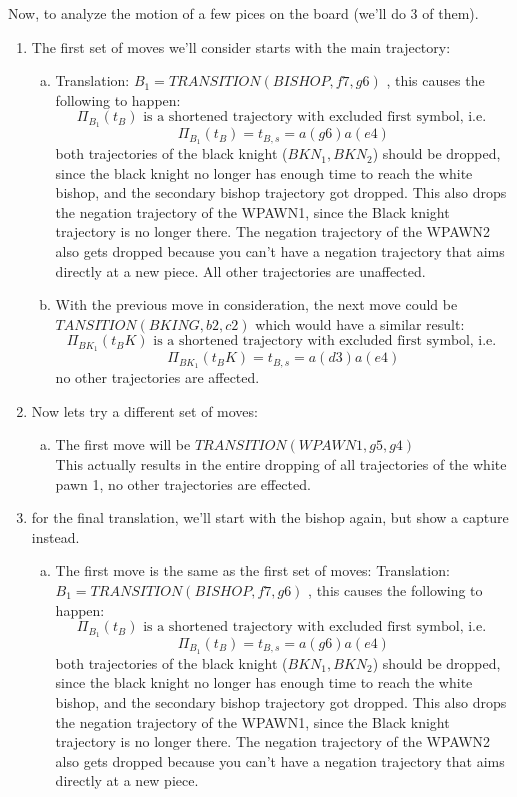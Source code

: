 \documentclass[11pt]{article}
\begin{document}
Now, to analyze the motion of a few pices on the board (we'll do 3 of them).
\begin{enumerate}
\item The first set of moves we'll consider starts with the main trajectory:
\begin{enumerate}[(a)]
\item Translation: $B_1 = TRANSITION(BISHOP, f7, g6)$ , this causes the following to happen: 
$$\Pi_{B_1}(t_B) \text{ is a shortened trajectory with excluded first symbol, i.e. }$$
$$\Pi_{B_1}(t_B) = t_{B,s} = a(g6)a(e4)$$
both trajectories of the black knight ($BKN_1, BKN_2$) should be dropped, since the black knight no longer has enough time to reach the white bishop, and the secondary bishop trajectory got dropped. This also drops the negation trajectory of the WPAWN1, since the Black knight trajectory is no longer there. The negation trajectory of the WPAWN2 also gets dropped because you can't have a negation trajectory that aims directly at a new piece. 
All other trajectories are unaffected. \\
\item With the previous move in consideration, the next move could be $TANSITION(BKING, b2, c2)$ which would have a similar result: 
$$\Pi_{BK_1}(t_BK) \text{ is a shortened trajectory with excluded first symbol, i.e. }$$
$$\Pi_{BK_1}(t_BK) = t_{B,s} = a(d3)a(e4)$$
no other trajectories are affected. \\
\end{enumerate}
\item Now lets try a different set of moves:
\begin{enumerate}[(a)]
\item The first move will be $ TRANSITION(WPAWN1, g5, g4)$\\
This actually results in the entire dropping of all trajectories of the white pawn 1, no other trajectories are effected.
\end{enumerate}
\item for the final translation, we'll start with the bishop again, but show a capture instead. 
\begin{enumerate}[(a)]
\item  The first move is the same as the first set of moves: Translation: $B_1 = TRANSITION(BISHOP, f7, g6)$ , this causes the following to happen: 
$$\Pi_{B_1}(t_B) \text{ is a shortened trajectory with excluded first symbol, i.e. }$$
$$\Pi_{B_1}(t_B) = t_{B,s} = a(g6)a(e4)$$
both trajectories of the black knight ($BKN_1, BKN_2$) should be dropped, since the black knight no longer has enough time to reach the white bishop, and the secondary bishop trajectory got dropped. This also drops the negation trajectory of the WPAWN1, since the Black knight trajectory is no longer there.  The negation trajectory of the WPAWN2 also gets dropped because you can't have a negation trajectory that aims directly at a new piece. 

\end{enumerate}
\end{enumerate}
\end{document}

